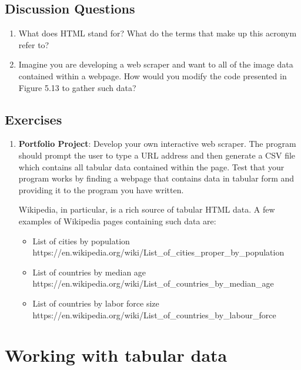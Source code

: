 \documentclass{book}
\begin{document}
\section{Discussion Questions}
\begin{enumerate}
	\item What does HTML stand for? What do the terms that make up this acronym refer to?
	\item Imagine you are developing a web scraper and want to all of the image data contained within a webpage. How would you modify the code presented in Figure 5.13 to gather such data?
\end{enumerate}
\section{Exercises}
\begin{enumerate}
	\item \textbf{Portfolio Project}: Develop your own interactive web scraper. The program should prompt the user to type a URL address and then generate a CSV file which contains all tabular data contained within the page. Test that your program works by finding a webpage that contains data in tabular form and providing it to the program you have written. 
	
	Wikipedia, in particular, is a rich source of tabular HTML data. A few examples of Wikipedia pages containing such data are:
	
	\begin{itemize}
		\item List of cities by population \\ https://en.wikipedia.org/wiki/List\_of\_cities\_proper\_by\_population
		
		\item List of countries by median age\\
		https://en.wikipedia.org/wiki/List\_of\_countries\_by\_median\_age
		
		\item List of countries by labor force size \\
		https://en.wikipedia.org/wiki/List\_of\_countries\_by\_labour\_force
		
	\end{itemize}
	
	 
\end{enumerate}

\chapter{Working with tabular data}
\end{document}
